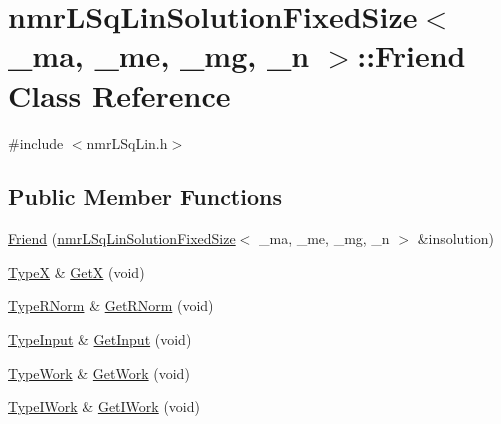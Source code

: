 \hypertarget{classnmr_l_sq_lin_solution_fixed_size_1_1_friend}{\section{nmr\-L\-Sq\-Lin\-Solution\-Fixed\-Size$<$ \-\_\-ma, \-\_\-me, \-\_\-mg, \-\_\-n $>$\-:\-:Friend Class Reference}
\label{classnmr_l_sq_lin_solution_fixed_size_1_1_friend}
}


{\ttfamily \#include $<$nmr\-L\-Sq\-Lin.\-h$>$}

\subsection*{Public Member Functions}
\begin{DoxyCompactItemize}
\item 
\hyperlink{classnmr_l_sq_lin_solution_fixed_size_1_1_friend_a0082f67ae7c48fad71b8afacb71ddb52}{Friend} (\hyperlink{classnmr_l_sq_lin_solution_fixed_size}{nmr\-L\-Sq\-Lin\-Solution\-Fixed\-Size}$<$ \-\_\-ma, \-\_\-me, \-\_\-mg, \-\_\-n $>$ \&insolution)
\item 
\hyperlink{classnmr_l_sq_lin_solution_fixed_size_aa00d3b54073dac6aba6e3793d4f88348}{Type\-X} \& \hyperlink{classnmr_l_sq_lin_solution_fixed_size_1_1_friend_a1ea3dfb316ad254d671e608e62710f20}{Get\-X} (void)
\item 
\hyperlink{classnmr_l_sq_lin_solution_fixed_size_a384dc1235386018c6edbdc782c5f84be}{Type\-R\-Norm} \& \hyperlink{classnmr_l_sq_lin_solution_fixed_size_1_1_friend_aa2948ee8354630fdb64f7ec1611ee6d2}{Get\-R\-Norm} (void)
\item 
\hyperlink{classnmr_l_sq_lin_solution_fixed_size_adf9a982c0414dafb9fb1164b8da4f96f}{Type\-Input} \& \hyperlink{classnmr_l_sq_lin_solution_fixed_size_1_1_friend_a66a2b590c843bdfb703e05004a63adda}{Get\-Input} (void)
\item 
\hyperlink{classnmr_l_sq_lin_solution_fixed_size_a2804f3b3815a82a0f9655bcd2f86e7e4}{Type\-Work} \& \hyperlink{classnmr_l_sq_lin_solution_fixed_size_1_1_friend_aa42755764ab4cf09e6da2ce7d8b1159c}{Get\-Work} (void)
\item 
\hyperlink{classnmr_l_sq_lin_solution_fixed_size_a1838601b0a3e6fa7972e8854b888152a}{Type\-I\-Work} \& \hyperlink{classnmr_l_sq_lin_solution_fixed_size_1_1_friend_a69d7e55c3fd7922ebb4057ae2b0b19c9}{Get\-I\-Work} (void)
\end{DoxyCompactItemize}


